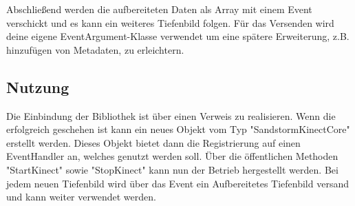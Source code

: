 \begin{Spacing}{\mylinespace}
Abschließend werden die aufbereiteten Daten als Array mit einem Event verschickt und es kann ein weiteres Tiefenbild folgen. Für das Versenden wird deine eigene EventArgument-Klasse verwendet um eine spätere Erweiterung, z.B. hinzufügen von Metadaten, zu erleichtern.

\subsection{Nutzung}

Die Einbindung der Bibliothek ist über einen Verweis zu realisieren. Wenn die erfolgreich geschehen ist kann ein neues Objekt vom Typ "SandstormKinectCore" erstellt werden. Dieses Objekt bietet dann die Registrierung auf einen EventHandler an, welches genutzt werden soll.
Über die öffentlichen Methoden "StartKinect" sowie "StopKinect" kann nun der Betrieb hergestellt werden. Bei jedem neuen Tiefenbild wird über das Event ein Aufbereitetes Tiefenbild versand und kann weiter verwendet werden.

\end{Spacing}
\newpage
\clearpage
